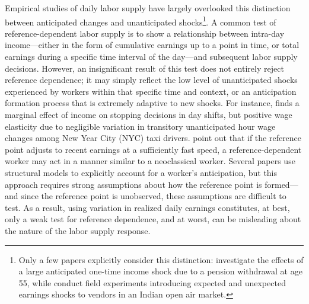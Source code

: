 \documentclass[reviewmode]{restud}
\begin{document}
Empirical studies of daily labor supply have largely overlooked this distinction between anticipated changes and unanticipated shocks\footnote{ Only a few papers explicitly consider this distinction: \citet{agarwal2017anticipated} investigate the effects of a large anticipated one-time income shock due to a pension withdrawal at age 55, while \citet{andersen2014toward} conduct field experiments  introducing expected and unexpected earnings shocks to vendors in an Indian open air market.}. A common test of reference-dependent labor supply is to show a relationship between intra-day income---either in the form of cumulative earnings up to a point in time, or total earnings during a specific time interval of the day---and subsequent labor supply decisions. However, an insignificant result of this test does not entirely reject reference dependence; it may simply reflect the low level of unanticipated shocks experienced by workers within that specific time and context, or an anticipation formation process that is extremely adaptive to new shocks. For instance, \citet{farber2015you} finds a marginal effect of income on stopping decisions in day shifts, but positive wage elasticity due to negligible variation in transitory unanticipated hour wage changes among New Year City (NYC) taxi drivers. \citet{thakral2018daily} point out that if the reference point adjusts to recent earnings at a sufficiently fast speed, a reference-dependent worker may act in a manner similar to a neoclassical worker. Several papers use structural models to explicitly account for a worker's anticipation, but this approach requires strong assumptions about how the reference point is formed---and since the reference point is unobserved, these assumptions are difficult to test. As a result, using variation in realized daily earnings constitutes, at best, only a weak test for reference dependence, and at worst, can be misleading about the nature of the labor supply response.
\end{document}
